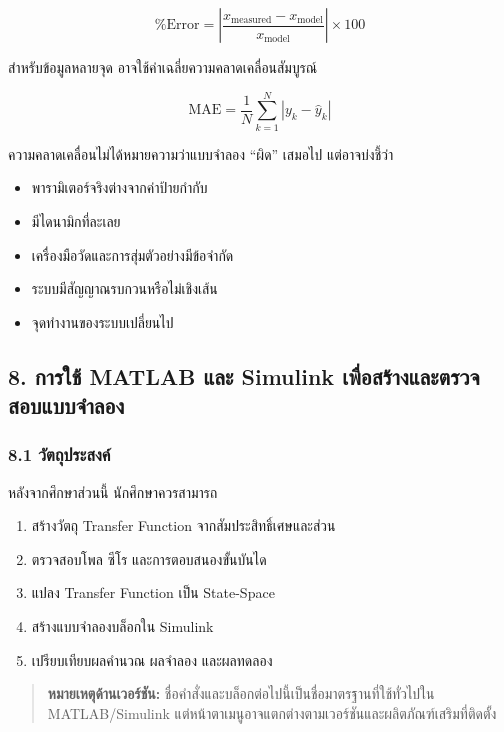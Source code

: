 \[
\%\text{Error}
=
\left|
\frac{x_{\text{measured}}-x_{\text{model}}}
{x_{\text{model}}}
\right|\times100
\]

สำหรับข้อมูลหลายจุด อาจใช้ค่าเฉลี่ยความคลาดเคลื่อนสัมบูรณ์

\[
\text{MAE}
=
\frac{1}{N}\sum_{k=1}^{N}
|y_k-\hat{y}_k|
\]

ความคลาดเคลื่อนไม่ได้หมายความว่าแบบจำลอง “ผิด” เสมอไป แต่อาจบ่งชี้ว่า

\begin{itemize}
    \item พารามิเตอร์จริงต่างจากค่าป้ายกำกับ
    \item มีไดนามิกที่ละเลย
    \item เครื่องมือวัดและการสุ่มตัวอย่างมีข้อจำกัด
    \item ระบบมีสัญญาณรบกวนหรือไม่เชิงเส้น
    \item จุดทำงานของระบบเปลี่ยนไป
\end{itemize}


\subsection{8. การใช้ MATLAB และ Simulink เพื่อสร้างและตรวจสอบแบบจำลอง}

\subsubsection{8.1 วัตถุประสงค์}

หลังจากศึกษาส่วนนี้ นักศึกษาควรสามารถ

\begin{enumerate}
    \item สร้างวัตถุ Transfer Function จากสัมประสิทธิ์เศษและส่วน
    \item ตรวจสอบโพล ซีโร และการตอบสนองขั้นบันได
    \item แปลง Transfer Function เป็น State-Space
    \item สร้างแบบจำลองบล็อกใน Simulink
    \item เปรียบเทียบผลคำนวณ ผลจำลอง และผลทดลอง
\end{enumerate}

\begin{quote}
\textbf{หมายเหตุด้านเวอร์ชัน:} ชื่อคำสั่งและบล็อกต่อไปนี้เป็นชื่อมาตรฐานที่ใช้ทั่วไปใน MATLAB/Simulink แต่หน้าตาเมนูอาจแตกต่างตามเวอร์ชันและผลิตภัณฑ์เสริมที่ติดตั้ง
\end{quote}

